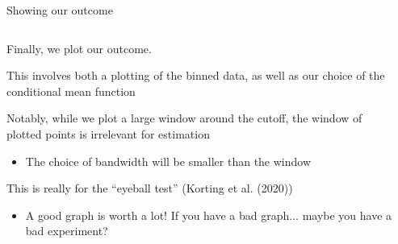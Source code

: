 \documentclass[notes,11pt, aspectratio=169]{beamer}
\newenvironment{wideitemize}{\itemize\addtolength{\itemsep}{10pt}}{\enditemize}
\begin{document}
\begin{frame}{Showing our outcome}
    \begin{columns}[onlytextwidth, T] %
      \begin{column}{0.5\textwidth}
        \begin{wideitemize}
        \item Finally, we plot our outcome.
        \item This involves both a plotting of the binned data, as
          well as our choice of the conditional mean function
        \item Notably, while we plot a large window around the cutoff, the window of plotted points is irrelevant for estimation
          \begin{itemize}
          \item The choice of bandwidth will be smaller than the window 
          \end{itemize}
        \item This is really for the ``eyeball test'' (Korting et al. (2020))
          \begin{itemize}
          \item A good graph is worth a lot! If you have a bad graph... maybe you have a bad experiment?
          \end{itemize}
        \end{wideitemize}
      \end{column}%
      \hfill%
      \begin{column}{.5\textwidth}
      \end{column}%
    \end{columns}
\end{frame}
\end{document}
